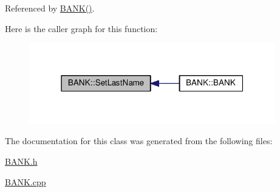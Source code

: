 Referenced by \hyperlink{_b_a_n_k_8h_source_l00029}{B\+A\+N\+K()}.



Here is the caller graph for this function\+:\nopagebreak
\begin{figure}[H]
\begin{center}
\leavevmode
\includegraphics[width=304pt]{class_b_a_n_k_a480fa0973e3e27df92be6767b2f9a652_icgraph}
\end{center}
\end{figure}




The documentation for this class was generated from the following files\+:\begin{DoxyCompactItemize}
\item 
\hyperlink{_b_a_n_k_8h}{B\+A\+N\+K.\+h}\item 
\hyperlink{_b_a_n_k_8cpp}{B\+A\+N\+K.\+cpp}\end{DoxyCompactItemize}
